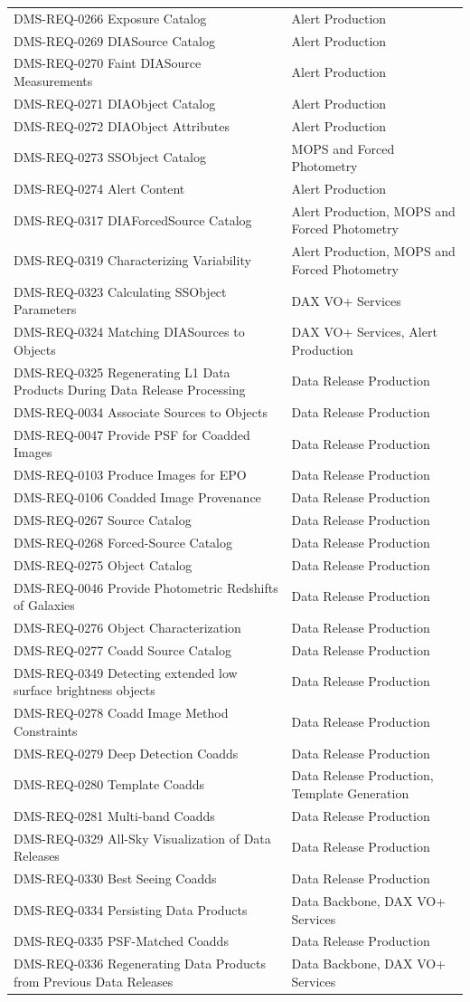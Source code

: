 \documentclass[DM,lsstdraft,toc]{lsstdoc}
\begin{document}
\begin{longtable}[]{@{}ll@{}}
DMS-REQ-0266 Exposure Catalog & Alert Production\tabularnewline
DMS-REQ-0269 DIASource Catalog & Alert Production\tabularnewline
DMS-REQ-0270 Faint DIASource Measurements & Alert
Production\tabularnewline
DMS-REQ-0271 DIAObject Catalog & Alert Production\tabularnewline
DMS-REQ-0272 DIAObject Attributes & Alert Production\tabularnewline
DMS-REQ-0273 SSObject Catalog & MOPS and Forced
Photometry\tabularnewline
DMS-REQ-0274 Alert Content & Alert Production\tabularnewline
DMS-REQ-0317 DIAForcedSource Catalog & Alert Production, MOPS and Forced
Photometry\tabularnewline
DMS-REQ-0319 Characterizing Variability & Alert Production, MOPS and
Forced Photometry\tabularnewline
DMS-REQ-0323 Calculating SSObject Parameters & DAX VO+
Services\tabularnewline
DMS-REQ-0324 Matching DIASources to Objects & DAX VO+ Services, Alert
Production\tabularnewline
DMS-REQ-0325 Regenerating L1 Data Products During Data Release
Processing & Data Release Production\tabularnewline
DMS-REQ-0034 Associate Sources to Objects & Data Release
Production\tabularnewline
DMS-REQ-0047 Provide PSF for Coadded Images & Data Release
Production\tabularnewline
DMS-REQ-0103 Produce Images for EPO & Data Release
Production\tabularnewline
DMS-REQ-0106 Coadded Image Provenance & Data Release
Production\tabularnewline
DMS-REQ-0267 Source Catalog & Data Release Production\tabularnewline
DMS-REQ-0268 Forced-Source Catalog & Data Release
Production\tabularnewline
DMS-REQ-0275 Object Catalog & Data Release Production\tabularnewline
DMS-REQ-0046 Provide Photometric Redshifts of Galaxies & Data Release
Production\tabularnewline
DMS-REQ-0276 Object Characterization & Data Release
Production\tabularnewline
DMS-REQ-0277 Coadd Source Catalog & Data Release
Production\tabularnewline
DMS-REQ-0349 Detecting extended low surface brightness objects & Data
Release Production\tabularnewline
DMS-REQ-0278 Coadd Image Method Constraints & Data Release
Production\tabularnewline
DMS-REQ-0279 Deep Detection Coadds & Data Release
Production\tabularnewline
DMS-REQ-0280 Template Coadds & Data Release Production, Template
Generation\tabularnewline
DMS-REQ-0281 Multi-band Coadds & Data Release Production\tabularnewline
DMS-REQ-0329 All-Sky Visualization of Data Releases & Data Release
Production\tabularnewline
DMS-REQ-0330 Best Seeing Coadds & Data Release Production\tabularnewline
DMS-REQ-0334 Persisting Data Products & Data Backbone, DAX VO+
Services\tabularnewline
DMS-REQ-0335 PSF-Matched Coadds & Data Release Production\tabularnewline
DMS-REQ-0336 Regenerating Data Products from Previous Data Releases &
Data Backbone, DAX VO+ Services\tabularnewline

\end{longtable}
\end{document}
